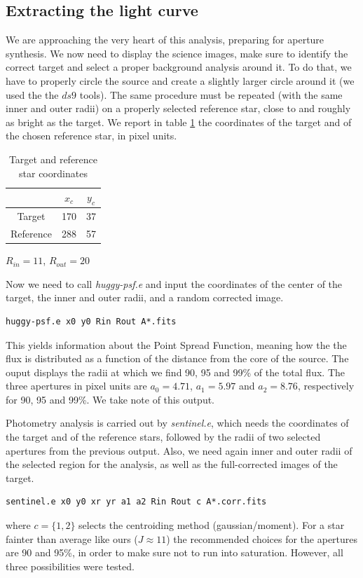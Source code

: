 \documentclass[a4paper,11pt,twocolumn]{article}
\begin{document}
\subsection{Extracting the light curve}
We are approaching the very heart of this analysis, preparing for 
aperture synthesis. We now need to display the science images, make 
sure to identify the correct target and select a proper background 
analysis around it. To do that, we have to properly circle the source 
and create a slightly larger circle around it (we used the the $ds9$ tools).
The same procedure must be repeated (with the same inner and outer radii) 
on a properly selected reference star, close to and roughly as bright 
as the target. We report in table \ref{table:c} the coordinates of the target and of the 
chosen reference star, in pixel units.

\begin{table}[h!]
\centering
    \begin{tabular}{ccc}
    \hline
     & $x_c$ & $y_c$ \\
    \hline
    Target    &  170  &  37    \\
    Reference & 288 & 57  \\
    \hline
    \end{tabular}
\caption{Target and reference star coordinates}
\label{table:c}
\end{table}
\begin{center}
    $R_{in} = 11$, $R_{out} = 20$
\end{center}
Now we need to call \textit{huggy-psf.e} and input the coordinates of the 
center of the target, the inner and outer radii, and a random corrected 
image.
\begin{lstlisting}
huggy-psf.e x0 y0 Rin Rout A*.fits
\end{lstlisting}
This yields information about the Point Spread Function, meaning how the 
the flux is distributed as a function of the distance from the core of 
the source. The ouput displays the radii at which we find 90, 95 and 99\%
of the total flux. The three apertures in pixel units are $a_0=4.71$, 
$a_1=5.97$ and $a_2=8.76$, respectively for 90, 95 and 99\%. 
We take note of this output. 


Photometry analysis is carried out by \textit{sentinel.e}, which needs 
the coordinates of the target and of the reference stars, followed by 
the radii of two selected apertures from the previous output. Also, we need 
again inner and outer radii of the selected region for the analysis, as well 
as the full-corrected images of the target. 
\begin{lstlisting}
sentinel.e x0 y0 xr yr a1 a2 Rin Rout c A*.corr.fits
\end{lstlisting}
where $c=\{1,2\}$ selects the centroiding method (gaussian/moment). For a star
fainter than average like ours ($J\approx 11$) the recommended choices for 
the apertures are 90 and 95\%, in order to make sure not to run into 
saturation. However, all three possibilities were tested. 
\end{document}
